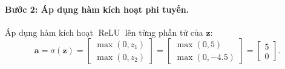 \paragraph{Bước 2: Áp dụng hàm kích hoạt phi tuyến.\\}
Áp dụng hàm kích hoạt $\operatorname{ReLU}$ lên từng phần tử của $\mathbf{z}$:
\[\mathbf{a} = \sigma(\mathbf{z}) = \begin{bmatrix} \max(0, z_1) \\ \max(0, z_2) \end{bmatrix} = \begin{bmatrix} \max(0, 5) \\ \max(0, -4.5) \end{bmatrix} = \begin{bmatrix} 5 \\ 0 \end{bmatrix}.\]

